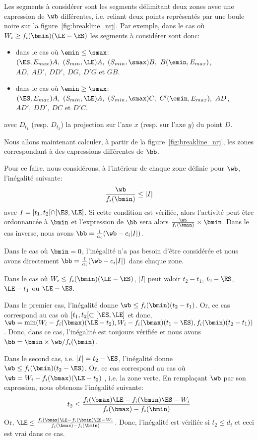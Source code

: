 Les segments à considérer sont les segments délimitant deux zones avec
une expression de $\wb$ différentes, i.e. reliant deux points
représentés par une boule noire sur la
figure~\ref{fig:breakline_nrj}. Par exemple, dans le cas où $W_i \ge
f_i(\bmin)(\LE-\ES)$ les segments à considérer sont donc:
\begin{itemize}
\item dans le cas où $\emin \le \smax$: $(\ES ,E_{max})A,\ (S_{min},
  \LE)A,\ (S_{min},\smax)B,\ B(\emin,E_{max})$,  $AD,\ AD',\
  DD' ,\ DG,\ D'G$ et $GB$.
\item dans le cas où $\emin\ge \smax$: $(\ES ,E_{max})A,\ (S_{min},
  \LE)A,\ (S_{min},\smax)C,\ C'(\emin,E_{max}),\ AD$, $ AD',\
  DD' ,\ DC$ et $D'C$.
\end{itemize}
avec $D_{t_1}$ (resp. $D_{t_2}$) la projection sur l'axe $x$
(resp. sur l'axe $y$) du point $D$.


Nous allons maintenant calculer, à partir de la
figure~\ref{fig:breakline_nrj}, les zones correspondant à des
expressions différentes de $\bb$. 

Pour ce faire, nous considérons, à l'intérieur de chaque zone définie
pour $\wb$, l'inégalité suivante: 
\[ \frac{\wb}{f_i(\bmin)} \le |I|\]
avec $I=[t_1,t_2[ \cap [\ES,\LE]$. Si cette condition est vérifiée,
alors l'activité peut être ordonnancée à $\bmin$ et l'expression de
$\bb$ sera alors $\frac{\wb}{f_i(\bmin)}\times \bmin$. Dans le cas
inverse, nous avons $\bb=\frac{1}{a_i}(\wb-c_i|I|)$. 

Dans le cas où $\bmin=0$, l'inégalité n'a pas besoin d'être considérée et
nous avons directement $\bb=\frac{1}{a_i}(\wb-c_i|I|)$ dans chaque
zone. 

Dans le cas où $W_i\le f_i(\bmin)(\LE-\ES)$, $|I|$ peut valoir
$t_2-t_1$, $t_2-\ES$, $\LE-t_1$ ou $\LE-\ES$. 

Dans le premier cas,
l'inégalité donne $\wb \le f_i(\bmin)(t_2-t_1)$. Or, ce cas correspond
au cas où $[t_1,t_2[ \subset [\ES,\LE]$ et donc, $\wb=\min(W_i -
f_i(\bmax)(\LE-t_2), W_i - f_i(\bmax)(t_1-\ES),
f_i(\bmin)(t_2-t_1))$. Donc, dans ce cas, l'inégalité est toujours
vérifiée et nous avons $\bb = \bmin \times \wb/f_i(\bmin)$. 

Dans le second cas,
i.e. $|I|=t_2-\ES$, l'inégalité donne $\wb \le
f_i(\bmin)(t_2-\ES)$. Or, ce cas correspond au cas où $\wb = W_i -
f_i(\bmax)(\LE -t_2)$ , i.e. la zone verte. En remplaçant $\wb$ par
son expression, nous obtenons l'inégalité suivante: 
\[t_2 \le \frac{f_i(\bmax)\LE - f_i(\bmin)\ES - W_i }{f_i(\bmax) -
    f_i(\bmin)} \]
Or, $\LE  \le \frac{f_i(\bmax)\LE - f_i(\bmin)\ES - W_i }{f_i(\bmax) -
  f_i(\bmin)}$. Donc, l'inégalité est vérifiée si $t_2 \le d_i$
et ceci est vrai dans ce cas. 

